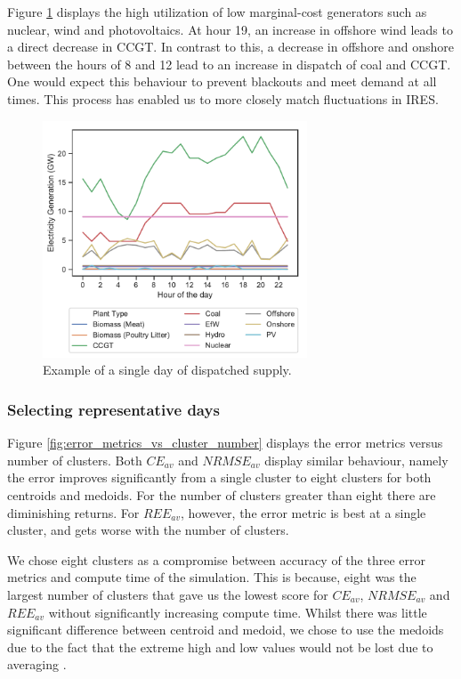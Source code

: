 Figure \ref{fig:single_dispatched_day} displays the high utilization of low marginal-cost generators such as nuclear, wind and photovoltaics. At hour 19, an increase in offshore wind leads to a direct decrease in CCGT. In contrast to this, a decrease in offshore and onshore between the hours of 8 and 12 lead to an increase in dispatch of coal and CCGT. One would expect this behaviour to prevent blackouts and meet demand at all times. This process has enabled us to more closely match fluctuations in IRES.

\begin{figure}
	\centering
	\includegraphics[width=0.7\textwidth]{Chapter4/figures/e-Energy-2020/methods_and_materials/clusters_results_single_day.pdf}
	\caption{Example of a single day of dispatched supply.}
	\label{fig:single_dispatched_day}
\end{figure}


\subsubsection{Selecting representative days}
\label{ssec:res_repr_days}

Figure \ref{fig:error_metrics_vs_cluster_number} displays the error metrics versus number of clusters. Both $CE_{av}$ and $NRMSE_{av}$ display similar behaviour, namely the error improves significantly from a single cluster to eight clusters for both centroids and medoids. For the number of clusters greater than eight there are diminishing returns. For $REE_{av}$, however, the error metric is best at a single cluster, and gets worse with the number of clusters. 



We chose eight clusters as a compromise between accuracy of the three error metrics and compute time of the simulation. This is because, eight was the largest number of clusters that gave us the lowest score for $CE_{av}$, $NRMSE_{av}$ and $REE_{av}$ without significantly increasing compute time. Whilst there was little significant difference between centroid and medoid, we chose to use the medoids due to the fact that the extreme high and low values would not be lost due to averaging \cite{Hilbers2019}.




